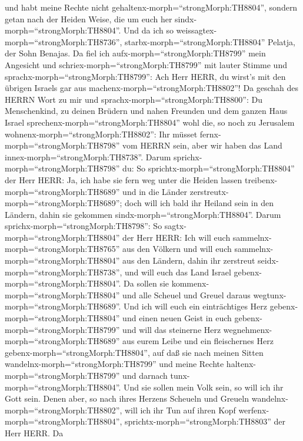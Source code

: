 und habt meine Rechte nicht gehaltenx-morph=``strongMorph:TH8804'',
sondern getan nach der Heiden Weise, die um euch her
sindx-morph=``strongMorph:TH8804''.  Und da ich so
weissagtex-morph=``strongMorph:TH8736'',
starbx-morph=``strongMorph:TH8804'' Pelatja, der Sohn Benajas. Da fiel
ich aufx-morph=``strongMorph:TH8799'' mein Angesicht und
schriex-morph=``strongMorph:TH8799'' mit lauter Stimme und
sprachx-morph=``strongMorph:TH8799'': Ach Herr HERR, du wirst's mit den
übrigen Israels gar aus machenx-morph=``strongMorph:TH8802''!
 Da geschah des HERRN Wort zu mir und
sprachx-morph=``strongMorph:TH8800'':  Du Menschenkind, zu
deinen Brüdern und nahen Freunden und dem ganzen Haus Israel
sprechenx-morph=``strongMorph:TH8804'' wohl die, so noch zu Jerusalem
wohnenx-morph=``strongMorph:TH8802'': Ihr müsset
fernx-morph=``strongMorph:TH8798'' vom HERRN sein, aber wir haben das
Land innex-morph=``strongMorph:TH8738''.  Darum
sprichx-morph=``strongMorph:TH8798'' du: So
sprichtx-morph=``strongMorph:TH8804'' der Herr HERR: Ja, ich habe sie
fern weg unter die Heiden lassen treibenx-morph=``strongMorph:TH8689''
und in die Länder zerstreutx-morph=``strongMorph:TH8689''; doch will ich
bald ihr Heiland sein in den Ländern, dahin sie gekommen
sindx-morph=``strongMorph:TH8804''.  Darum
sprichx-morph=``strongMorph:TH8798'': So
sagtx-morph=``strongMorph:TH8804'' der Herr HERR: Ich will euch
sammelnx-morph=``strongMorph:TH8765'' aus den Völkern und will euch
sammelnx-morph=``strongMorph:TH8804'' aus den Ländern, dahin ihr
zerstreut seidx-morph=``strongMorph:TH8738'', und will euch das Land
Israel gebenx-morph=``strongMorph:TH8804''.  Da sollen sie
kommenx-morph=``strongMorph:TH8804'' und alle Scheuel und Greuel daraus
wegtunx-morph=``strongMorph:TH8689''.  Und ich will euch
ein einträchtiges Herz gebenx-morph=``strongMorph:TH8804'' und einen
neuen Geist in euch gebenx-morph=``strongMorph:TH8799'' und will das
steinerne Herz wegnehmenx-morph=``strongMorph:TH8689'' aus eurem Leibe
und ein fleischernes Herz gebenx-morph=``strongMorph:TH8804'',
 auf daß sie nach meinen Sitten
wandelnx-morph=``strongMorph:TH8799'' und meine Rechte
haltenx-morph=``strongMorph:TH8799'' und darnach
tunx-morph=``strongMorph:TH8804''. Und sie sollen mein Volk sein, so
will ich ihr Gott sein.  Denen aber, so nach ihres Herzens
Scheueln und Greueln wandelnx-morph=``strongMorph:TH8802'', will ich ihr
Tun auf ihren Kopf werfenx-morph=``strongMorph:TH8804'',
sprichtx-morph=``strongMorph:TH8803'' der Herr HERR.  Da
